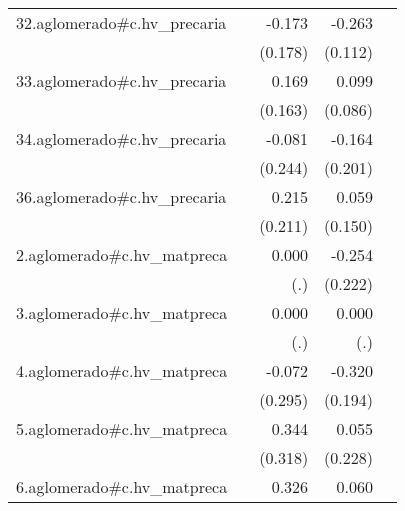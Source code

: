 {\begin{longtable}{l*{4}{D{.}{.}{-1}}}
\addlinespace
32.aglomerado#c.hv\_precaria&                     &      -0.173         &      -0.263\sym{*}  &                     \\
            &                     &     (0.178)         &     (0.112)         &                     \\
\addlinespace
33.aglomerado#c.hv\_precaria&                     &       0.169         &       0.099         &                     \\
            &                     &     (0.163)         &     (0.086)         &                     \\
\addlinespace
34.aglomerado#c.hv\_precaria&                     &      -0.081         &      -0.164         &                     \\
            &                     &     (0.244)         &     (0.201)         &                     \\
\addlinespace
36.aglomerado#c.hv\_precaria&                     &       0.215         &       0.059         &                     \\
            &                     &     (0.211)         &     (0.150)         &                     \\
\addlinespace
2.aglomerado#c.hv\_matpreca&                     &       0.000         &      -0.254         &                     \\
            &                     &         (.)         &     (0.222)         &                     \\
\addlinespace
3.aglomerado#c.hv\_matpreca&                     &       0.000         &       0.000         &                     \\
            &                     &         (.)         &         (.)         &                     \\
\addlinespace
4.aglomerado#c.hv\_matpreca&                     &      -0.072         &      -0.320         &                     \\
            &                     &     (0.295)         &     (0.194)         &                     \\
\addlinespace
5.aglomerado#c.hv\_matpreca&                     &       0.344         &       0.055         &                     \\
            &                     &     (0.318)         &     (0.228)         &                     \\
\addlinespace
6.aglomerado#c.hv\_matpreca&                     &       0.326         &       0.060         &                     \\

\end{longtable}}
